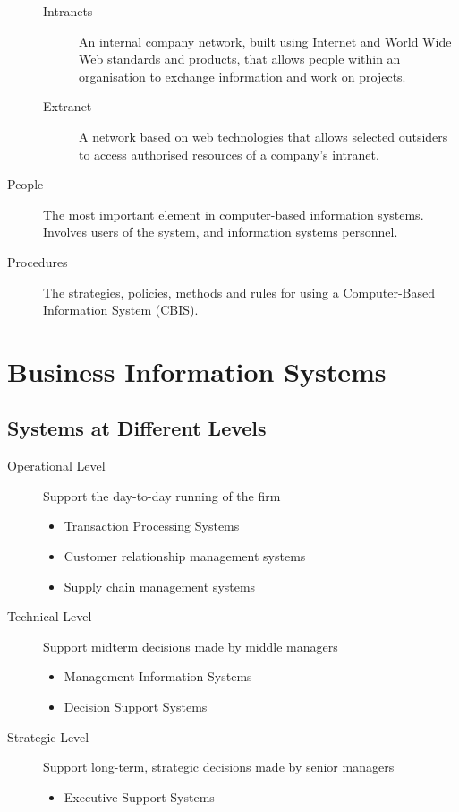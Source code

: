 \documentclass[\main/notes.tex]{subfiles}
\begin{document}
\begin{description}
\begin{description}
								\item[Intranets] An internal company network, built using Internet and World Wide Web standards and products, that allows people within an organisation to exchange information and work on projects.
								\item[Extranet] A network based on web technologies that allows selected outsiders to access authorised resources of a company's intranet.
							\end{description}
						\item[People] The most important element in computer-based information systems. Involves users of the system, and information systems personnel.
						\item[Procedures] The strategies, policies, methods and rules for using a Computer-Based Information System (CBIS). 
					\end{description}
		\pagebreak
		\section{Business Information Systems}
			\subsection{Systems at Different Levels}
					\begin{description}
						\item[Operational Level] Support the day-to-day running of the firm
							\begin{itemize}
								\item Transaction Processing Systems
								\item Customer relationship management systems
								\item Supply chain management systems
							\end{itemize}
						\item[Technical Level] Support midterm decisions made by middle managers
							\begin{itemize}
								\item Management Information Systems
								\item Decision Support Systems
							\end{itemize}
						\item[Strategic Level] Support long-term, strategic decisions made by senior managers
							\begin{itemize}
								\item Executive Support Systems
							\end{itemize}
					\end{description}
\end{document}

